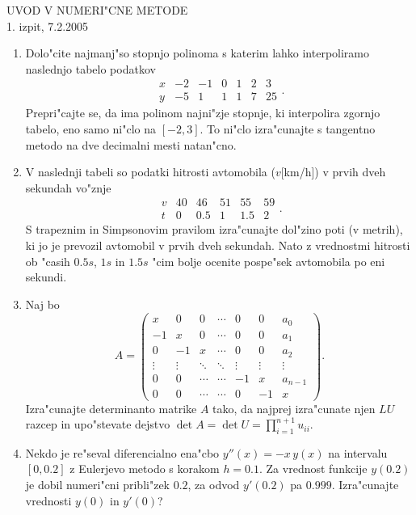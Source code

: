 

\begin{center}
  {\large UVOD V NUMERI"CNE METODE\\
    1. izpit, 7.2.2005\\
    }
\end{center}
\vspace{2cm}

\begin{enumerate}

  \item Dolo"cite najmanj"so stopnjo polinoma s katerim
    lahko interpoliramo naslednjo tabelo podatkov
    $$\begin{array}{r|rrrrrr}
      x & -2 & -1 & 0 & 1 & 2 & 3\\ \hline
      y & -5 & 1  & 1 & 1 & 7 & 25
      \end{array}.
    $$
    Prepri"cajte se, da ima polinom najni"zje stopnje, ki interpolira
    zgornjo tabelo, eno samo ni"clo na $[-2,3]$. To ni"clo izra"cunajte s
    tangentno metodo na dve decimalni mesti natan"cno.
  
  \item V naslednji tabeli so podatki hitrosti avtomobila ($v$[km/h])
    v prvih dveh sekundah vo"znje
    $$\begin{array}{l|rrrrr}
    v & 40 & 46 & 51 & 55 & 59\\ \hline
    t & 0  & 0.5 & 1 & 1.5 & 2
    \end{array}.$$
    S trapeznim in Simpsonovim pravilom izra"cunajte dol"zino poti 
    (v me\-trih), ki jo je prevozil avtomobil v prvih dveh sekundah. Nato 
    z vrednostmi hitrosti ob "casih $0.5s$, $1s$ in $1.5s$ "cim bolje ocenite
    pospe"sek avtomobila po eni sekundi.

  \item Naj bo 
    $$A=\left(
      \begin{array}{ccccccc}
        x & 0 & 0 & \cdots & 0 & 0 & a_0\\
        -1& x & 0 & \cdots & 0 & 0 & a_1\\
        0 & -1& x & \cdots & 0 & 0 & a_2\\
        \vdots & \vdots & \ddots & \ddots & \vdots & \vdots & \vdots\\
        0 & 0 & \cdots & \cdots & -1 & x & a_{n-1}\\
        0 & 0 & \cdots & \cdots & 0 & -1 & x
      \end{array}\right) .
    $$
      Izra"cunajte determinanto matrike $A$ tako, da najprej
      izra"cunate njen $LU$ razcep in upo"stevate dejstvo
      $\det A=\det U=\prod_{i=1}^{n+1}u_{ii}$.
  \item Nekdo je re"seval diferencialno ena"cbo $y''(x)=-x\,y(x)$ 
    na intervalu $[0,0.2]$ z Eulerjevo metodo s korakom $h=0.1$.
    Za vrednost funkcije $y(0.2)$ je dobil numeri"cni pribli"zek $0.2$,
    za odvod $y'(0.2)$ pa $0.999$. Iz\-ra\-"cu\-najte vrednosti 
    $y(0)$ in $y'(0)$?
\end{enumerate}
 
